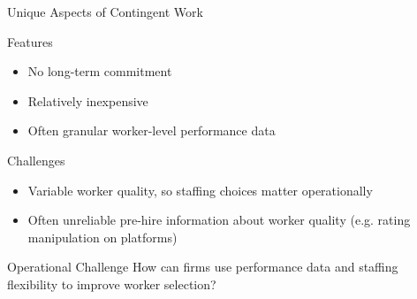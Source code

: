 \documentclass[10pt,aspectratio=169]{beamer}
\begin{document}
\begin{frame}{Unique Aspects of Contingent Work}
    \begin{block}{Features}
    \begin{itemize}
        \item No long-term commitment
        \item Relatively inexpensive
        \item Often granular worker-level performance data
    \end{itemize}
    \end{block}

    \begin{block}{Challenges}
    \begin{itemize}
        \item Variable worker quality, so staffing choices matter operationally
        \item Often unreliable pre-hire information about worker quality (e.g. rating manipulation on platforms)
    \end{itemize}
    \end{block}

    \begin{alertblock}{Operational Challenge}
        How can firms use performance data and staffing flexibility to improve worker selection?
    \end{alertblock}
    
\end{frame}
\end{document}
